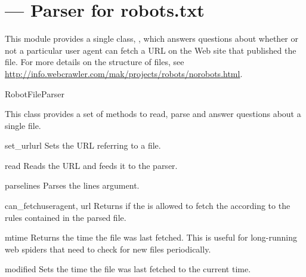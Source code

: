 \section{ --- 
         Parser for robots.txt}



This module provides a single class, , which answers
questions about whether or not a particular user agent can fetch a URL on
the Web site that published the  file.  For more details on 
the structure of  files, see
\url{http://info.webcrawler.com/mak/projects/robots/norobots.html}. 

\begin{classdesc}{RobotFileParser}{}

This class provides a set of methods to read, parse and answer questions
about a single  file.

\begin{methoddesc}{set_url}{url}
Sets the URL referring to a  file.
\end{methoddesc}

\begin{methoddesc}{read}{}
Reads the  URL and feeds it to the parser.
\end{methoddesc}

\begin{methoddesc}{parse}{lines}
Parses the lines argument.
\end{methoddesc}

\begin{methoddesc}{can_fetch}{useragent, url}
Returns  if the  is allowed to fetch the 
according to the rules contained in the parsed  file.
\end{methoddesc}

\begin{methoddesc}{mtime}{}
Returns the time the  file was last fetched.  This is
useful for long-running web spiders that need to check for new
 files periodically.
\end{methoddesc}

\begin{methoddesc}{modified}{}
Sets the time the  file was last fetched to the current
time.
\end{methoddesc}

\end{classdesc}

